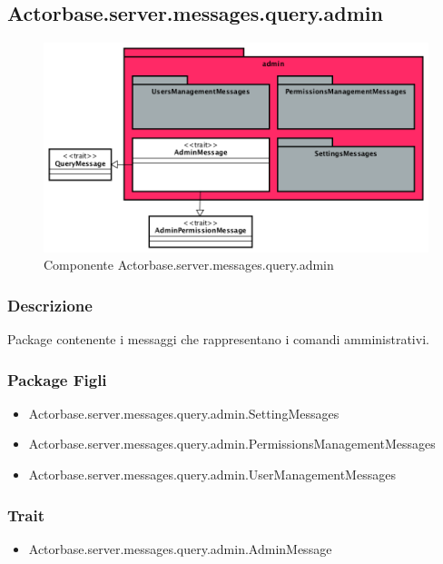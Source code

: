 \documentclass[a4paper]{article}
\begin{document}
		\subsection{Actorbase.server.messages.query.admin}
		
			\begin{figure}[H]
				\centering
				\includegraphics[width=\textwidth]{ST/Server/adminLevel.png}
				\caption{Componente Actorbase.server.messages.query.admin}
			\end{figure}
			
			\subsubsection{Descrizione}
				Package contenente i messaggi che rappresentano i comandi amministrativi.
				
			\subsubsection{Package Figli}
				\begin{itemize}
					\item Actorbase.server.messages.query.admin.SettingMessages
					\item Actorbase.server.messages.query.admin.PermissionsManagementMessages
					\item Actorbase.server.messages.query.admin.UserManagementMessages
				\end{itemize}
				
			\subsubsection{Trait}
				\begin{itemize}
					\item Actorbase.server.messages.query.admin.AdminMessage
				\end{itemize}
				
\end{document}
